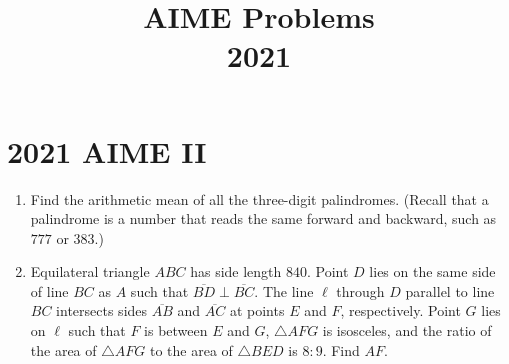 \documentclass{article}
\title{AIME Problems \\ 2021}
\date{}
\begin{document}
\maketitle\thispagestyle{fancy}\newpage\section*{2021 AIME II}
\begin{enumerate}[label=\arabic*., itemsep=0.5em]
\item Find the arithmetic mean of all the three-digit palindromes. (Recall that a palindrome is a number that reads the same forward and backward, such as \(777\) or \(383\).)\par \vspace{0.5em}\item Equilateral triangle \(ABC\) has side length \(840\). Point \(D\) lies on the same side of line \(BC\) as \(A\) such that \(\overline{BD} \perp \overline{BC}\). The line \(\ell\) through \(D\) parallel to line \(BC\) intersects sides \(\overline{AB}\) and \(\overline{AC}\) at points \(E\) and \(F\), respectively. Point \(G\) lies on \(\ell\) such that \(F\) is between \(E\) and \(G\), \(\triangle AFG\) is isosceles, and the ratio of the area of \(\triangle AFG\) to the area of \(\triangle BED\) is \(8:9\). Find \(AF\).


\end{enumerate}
\end{document}
